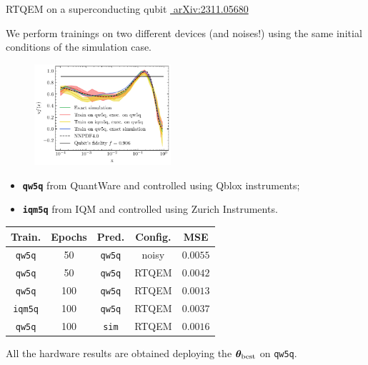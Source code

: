 \documentclass[8pt, xcolor={svgnames}, hyperref={linkcolor=black}, aspectratio=169]{beamer}
\begin{document}
\begin{frame}{RTQEM on a superconducting qubit \hfill \href{https://arxiv.org/abs/2311.05680}{\faBook\,\,arXiv:2311.05680}}

We perform trainings on two different devices (and noises!) using the same initial
conditions of the simulation case.
\pause
\begin{multicols}{2}

\begin{figure}
    \includegraphics[width=0.45\textwidth]{figures/100.pdf}%
\end{figure}
\pause
\begin{center}
\begin{itemize}[noitemsep]
  \item[\faCog] \textbf{\texttt{qw5q}} from QuantWare and controlled using Qblox instruments;
  \item[\faCog] \textbf{\texttt{iqm5q}} from IQM and controlled using Zurich Instruments.
\end{itemize}
\pause
\small
\begin{table}
\begin{tabular}{ccccc}
\hline \hline 
\textbf{Train.} & \textbf{Epochs} & \textbf{Pred.} &  \textbf{Config.} & MSE \\
\hline    
\texttt{qw5q} & 50 & \texttt{qw5q} & noisy & $0.0055$  \\     
\texttt{qw5q} & 50 & \texttt{qw5q} & RTQEM & $0.0042$ \\ 
\hline 
\texttt{qw5q} & 100 & \texttt{qw5q} & RTQEM & $0.0013$  \\     
\texttt{iqm5q} & 100 & \texttt{qw5q} & RTQEM & $0.0037$ \\   
\texttt{qw5q} & 100& \texttt{sim} & RTQEM & $0.0016$ \\   
\hline \hline
\end{tabular}
\centering
\end{table}
\end{center}
\end{multicols}
\pause
\begin{center}
All the hardware results are obtained deploying the $\bm{\theta}_{\rm best}$ on 
\texttt{qw5q}.
\end{center}
\end{frame}
\end{document}
